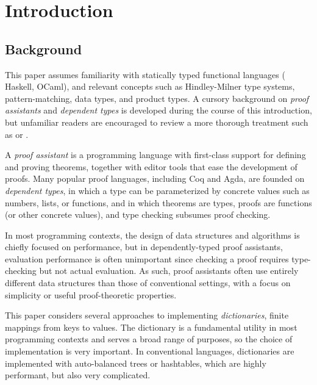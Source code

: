 \section{Introduction}
\label{sec:Introduction}

\newcommand{\firstUseGoal}[1]
  {\textbf{\emph{#1}}}


\subsection{Background}

This paper assumes familiarity with statically typed functional languages (\eg{} Haskell, OCaml), and relevant concepts such as Hindley-Milner type systems, pattern-matching, data types, and product types.
%
A cursory background on \emph{proof assistants} and \emph{dependent types} is developed during the course of this introduction, but unfamiliar readers are encouraged to review a more thorough treatment such as \citep{plfa} or \citep{Pierce:SF1}.

A \emph{proof assistant} is a programming language with first-class support for defining and proving theorems, together with editor tools that ease the development of proofs.
%
Many popular proof languages, including Coq and Agda, are founded on \emph{dependent types}, in which a type can be parameterized by concrete values such as numbers, lists, or functions,
%
and in which theorems are types, proofs are functions (or other concrete values), and type checking subsumes proof checking.

In most programming contexts, the design of data structures and algorithms is chiefly focused on performance, but in dependently-typed proof assistants, evaluation performance is often unimportant since checking a proof requires type-checking but not actual evaluation.
%
As such, proof assistants often use entirely different data structures than those of conventional settings, with a focus on simplicity or useful proof-theoretic properties.

This paper considers several approaches to implementing \emph{dictionaries}, \ie{} finite mappings from keys to values.
%
The dictionary is a fundamental utility in most programming contexts and serves a broad range of purposes, so the choice of implementation is very important.
%
In conventional languages, dictionaries are implemented with auto-balanced trees or hashtables, which are highly performant, but also very complicated.

